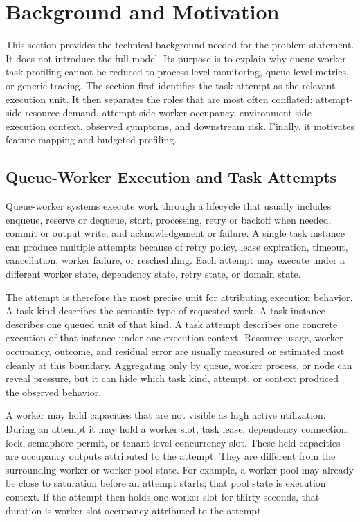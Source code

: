 \section{Background and Motivation}
\label{sec:background}

This section provides the technical background needed for the problem statement.
It does not introduce the full model. Its purpose is to explain why
queue-worker task profiling cannot be reduced to process-level monitoring,
queue-level metrics, or generic tracing. The section first identifies the task
attempt as the relevant execution unit. It then separates the roles that are
most often conflated: attempt-side resource demand, attempt-side worker
occupancy, environment-side execution context, observed symptoms, and downstream
risk. Finally, it motivates feature mapping and budgeted profiling.

\subsection{Queue-Worker Execution and Task Attempts}
\label{sec:background-queue-worker-execution}

Queue-worker systems execute work through a lifecycle that usually includes
enqueue, reserve or dequeue, start, processing, retry or backoff when needed,
commit or output write, and acknowledgement or failure. A single task instance
can produce multiple attempts because of retry policy, lease expiration, timeout,
cancellation, worker failure, or rescheduling. Each attempt may execute under a
different worker state, dependency state, retry state, or domain state.

The attempt is therefore the most precise unit for attributing execution
behavior. A task kind describes the semantic type of requested work. A task
instance describes one queued unit of that kind. A task attempt describes one
concrete execution of that instance under one execution context. Resource usage,
worker occupancy, outcome, and residual error are usually measured or estimated
most cleanly at this boundary. Aggregating only by queue, worker process, or node
can reveal pressure, but it can hide which task kind, attempt, or context
produced the observed behavior.

A worker may hold capacities that are not visible as high active utilization.
During an attempt it may hold a worker slot, task lease, dependency connection,
lock, semaphore permit, or tenant-level concurrency slot. These held capacities
are occupancy outputs attributed to the attempt. They are different from the
surrounding worker or worker-pool state. For example, a worker pool may already
be close to saturation before an attempt starts; that pool state is execution
context. If the attempt then holds one worker slot for thirty seconds, that
duration is worker-slot occupancy attributed to the attempt.

